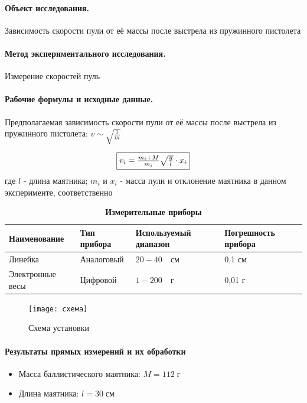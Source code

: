 \documentclass{article}
\begin{document}
\paragraph{Объект исследования.}
Зависимость скорости пули от её массы после выстрела из пружинного пистолета

\paragraph{Метод экспериментального исследования.}
Измерение скоростей пуль

 \paragraph{Рабочие формулы и исходные данные.}\hypertarget{formuls}{}
 \begin{flushleft}
 	Предполагаемая зависимость скорости пули от её массы после выстрела из пружинного пистолета: $ v\sim\sqrt{\frac{1}{m}}$
 \end{flushleft}

\begin{equation}
	\fbox{$v_i=\frac{m_i+M}{m_i}\sqrt{\frac{g}{l}}\cdot x_i$}
\end{equation}
 	где $l$ - длина маятника; $m_i$ и $x_i$ - масса пули и отклонение маятника в данном эксперименте, соответственно

\begin{table}[h]
	\caption{\bf Измерительные приборы}
	\begin{tabular}[c]{|p{7.5em}|p{7.5em}|p{7.5em}| p{7.5em}|}
		\hline
		Наименование & Тип прибора & Используемый диапазон & Погрешность прибора\\\hline
		Линейка & Аналоговый & $20 - 40\quad\mbox{см}$ & 0,1 см\\
		\hline
		Электронные весы& Цифровой & $1 - 200\quad\mbox{г}$ & 0,01 г \\
		\hline
	\end{tabular}
\end{table}

 \begin{figure}[htb]
 	\caption{Схема установки}
\centering \texttt{[image: схема]}
 \end{figure}

\paragraph{Результаты прямых измерений и их обработки}
\begin{itemize}
	\item Масса баллистического маятника: $ M=112\;\mbox{г} $ 
	\item Длина маятника: $ l=30\;\mbox{см}$
\end{itemize}
		
\end{document}
